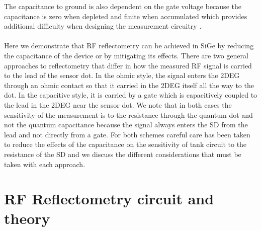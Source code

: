 \documentclass{article}
\begin{document}
	The capacitance to ground is also dependent on the gate voltage because the capacitance is zero when depleted and finite when accumulated which provides additional difficulty when designing the measurement circuitry
	.
	\\ \\
	Here we demonstrate that RF reflectometry can be achieved in SiGe by reducing the capacitance of the device or by mitigating its effects.  There are two general approaches to reflectometry that differ in how the measured RF signal is carried to the lead of the sensor dot.  In the ohmic style, the signal enters the 2DEG through an ohmic contact so that it carried in the 2DEG itself all the way to the dot.  In the capacitive style, it is carried by a gate which is capacitively coupled to the lead in the 2DEG near the sensor dot.  We note that in both cases the sensitivity of the measurement is to the resistance through the quantum dot and not the quantum capacitance because the signal always enters the SD from the lead and not directly from a gate.  For both schemes careful care has been taken to reduce the effects of the capacitance on the sensitivity of tank circuit to the resistance of the SD and we discuss the different considerations that must be taken with each approach. 

\section{RF Reflectometry circuit and theory} %
\label{sec:rf_reflectometry_circuit_and_theory}
\end{document}
